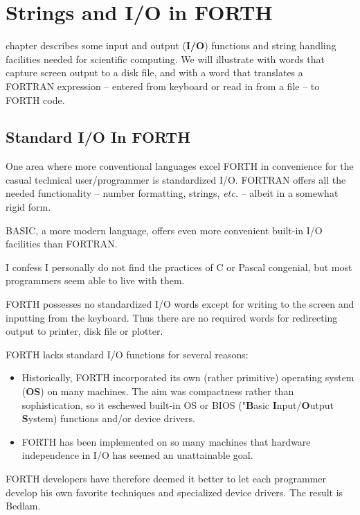 
\chapter{Strings and I/O in FORTH}

 chapter describes some input and output (\textbf{I/O}) functions and string handling facilities needed for scientific computing. We will illustrate with words that capture screen output to a disk file, and with a word that translates a FORTRAN expression -- entered from keyboard or read in from a file -- to FORTH code.

\section{Standard I/O In FORTH}

One area where more conventional languages excel FORTH in convenience for the casual technical user/programmer is standardized I/O. FORTRAN offers all the needed functionality -- number formatting, strings, \textit{etc.} -- albeit in a somewhat rigid form.

BASIC, a more modern language, offers even more convenient built-in I/O facilities than FORTRAN.

I confess I personally do not find the practices of C or Pascal congenial, but most programmers seem able to live with them.

FORTH possesses no standardized I/O words except for writing to the screen and inputting from the keyboard. Thus there are no required words for redirecting output to printer, disk file or plotter.

FORTH lacks standard I/O functions for several reasons:

\begin{itemize}
    \item Historically, FORTH incorporated its own (rather primitive) operating system (\textbf{OS}) on many machines. The aim was compactness rather than sophistication, so it eschewed built-in OS or BIOS ("\textbf{B}asic \textbf{I}nput/\textbf{O}utput \textbf{S}ystem) functions and/or device drivers.
    \item FORTH has been implemented on so many machines that hardware independence in I/O has seemed an unattainable goal.
\end{itemize}

FORTH developers have therefore deemed it better to let each programmer develop his own favorite techniques and specialized device drivers. The result is Bedlam.

